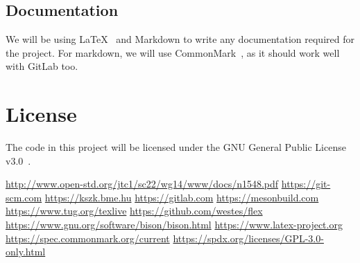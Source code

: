 \documentclass{article}
\begin{document}
\subsection{Documentation}
We will be using \LaTeX~\cite{latex} and Markdown to write any documentation
required for the project. For markdown, we will use CommonMark~\cite{md}, as it
should work well with GitLab too.

\section{License}
The code in this project will be licensed under the GNU General Public License
v3.0~\cite{gpl_v3}.

\begin{thebibliography}{1}
 \url{http://www.open-std.org/jtc1/sc22/wg14/www/docs/n1548.pdf}
 \url{https://git-scm.com}
 \url{https://kszk.bme.hu}
 \url{https://gitlab.com}
 \url{https://mesonbuild.com}
 \url{https://www.tug.org/texlive}
 \url{https://github.com/westes/flex}
 \url{https://www.gnu.org/software/bison/bison.html}
 \url{https://www.latex-project.org}
 \url{https://spec.commonmark.org/current}
 \url{https://spdx.org/licenses/GPL-3.0-only.html}
\end{thebibliography}
\end{document}
